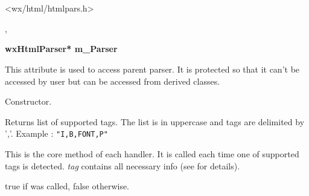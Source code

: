 %
%

\section{}\label{wxhtmltaghandler}




<wx/html/htmlpars.h>




,


\label{wxhtmltaghandlermparser}

{\bf wxHtmlParser* m\_Parser}

This attribute is used to access parent parser. It is protected so that
it can't be accessed by user but can be accessed from derived classes.

\label{wxhtmltaghandlerwxhtmltaghandler}


Constructor.

\label{wxhtmltaghandlergetsupportedtags}


Returns list of supported tags. The list is in uppercase and tags
are delimited by ','. Example : {\tt "I,B,FONT,P" }

\label{wxhtmltaghandlerhandletag}


This is the core method of each handler. It is called each time
one of supported tags is detected. {\it tag} contains all necessary
info (see  for details).


true if  was called,
false otherwise.

